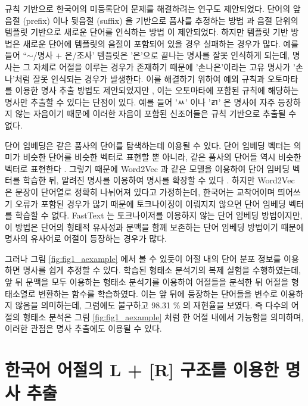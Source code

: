 \documentclass[oneside, ko,phd]{snuthesis_utf8_kor}
\begin{document}
규칙 기반으로 한국어의 미등록단어 문제를 해결하려는 연구도 제안되었다.
단어의 앞음절 (prefix) 이나 뒷음절 (suffix) 을 기반으로 품사를 추정하는 방법 \cite{Lee2016functional} 과 음절 단위의 템플릿 기반으로 새로운 단어를 인식하는 방법 \cite{hong2008new} 이 제안되었다.
하지만 템플릿 기반 방법은 새로운 단어에 템플릿의 음절이 포함되어 있을 경우 실패하는 경우가 많다.
예를 들어 “$\sim$/명사 + 은/조사' 템플릿은 '은'으로 끝나는 명사를 잘못 인식하게 되는데, 명사는 그 자체로 어절을 이루는 경우가 존재하기 때문에 '손나은'이라는 고유 명사가 '손나'처럼 잘못 인식되는 경우가 발생한다.
이를 해결하기 위하여 예외 규칙과 오토마타를 이용한 명사 추출 방법도 제안되었지만 \cite{lee2003efficient}, 이는 오토마타에 포함된 규칙에 해당하는 명사만 추출할 수 있다는 단점이 있다.
예를 들어 'ㅆ' 이나 'ㄺ' 은 명사에 자주 등장하지 않는 자음이기 때문에 이러한 자음이 포함된 신조어들은 규칙 기반으로 추출될 수 없다.

단어 임베딩은 같은 품사의 단어를 탐색하는데 이용될 수 있다.
단어 임베딩 벡터는 의미가 비슷한 단어를 비슷한 벡터로 표현할 뿐 아니라, 같은 품사의 단어들 역시 비슷한 벡터로 표현한다 \cite{bengio2003neural}.
그렇기 때문에 Word2Vec 과 같은 모델을 이용하여 단어 임베딩 벡터를 학습한 뒤, 알려진 명사를 이용하여 명사를 확장할 수 있다 \cite{mikolov2013distributed} .
하지만 Word2Vec 은 문장이 단어열로 정확히 나뉘어져 있다고 가정하는데, 한국어는 교착어이며 띄어쓰기 오류가 포함된 경우가 많기 때문에 토크나이징이 이뤄지지 않으면 단어 임베딩 벡터를 학습할 수 없다.
FastText \cite{bojanowski2017enriching} 는 토크나이저를 이용하지 않는 단어 임베딩 방법이지만, 이 방법은 단어의 형태적 유사성과 문맥을 함께 보존하는 단어 임베딩 방법이기 때문에 명사의 유사어로 어절이 등장하는 경우가 많다.

그러나 그림 \ref{fig:fig1_aexample} 에서 볼 수 있듯이 어절 내의 단어 분포 정보를 이용하면 명사를 쉽게 추정할 수 있다.
\cite{shim2016cloning} 학습된 형태소 분석기의 복제 실험을 수행하였는데, 앞 뒤 문맥을 모두 이용하는 형태소 분석기를 이용하여 어절들을 분석한 뒤 어절을 형태소열로 변환하는 함수를 학습하였다.
이는 앞 뒤에 등장하는 단어들을 변수로 이용하지 않음을 의미하는데, 그럼에도 불구하고 98.31 \% 의 재현율을 보였다.
즉 다수의 어절의 형태소 분석은 그림 \ref{fig:fig1_aexample} 처럼 한 어절 내에서 가능함을 의미하며, 이러한 관점은 명사 추출에도 이용될 수 있다.




\section{한국어 어절의 L + [R] 구조를 이용한 명사 추출}
\end{document}
